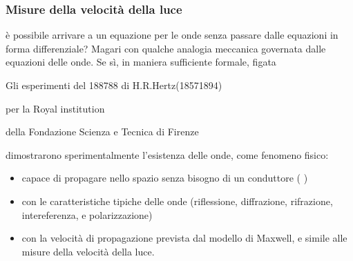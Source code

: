 \documentclass[letterpaper,10pt,italian]{jupyterBook}
\begin{document}
\subsubsection*{Misure della velocità della luce}

\sphinxAtStartPar
{}

\sphinxAtStartPar
{} è possibile arrivare a un equazione per le onde senza passare dalle equazioni in forma differenziale? Magari con qualche analogia meccanica governata dalle equazioni delle onde. Se sì, in maniera sufficiente formale, figata

\sphinxAtStartPar
{} Gli esperimenti del 1887\sphinxhyphen{}88 di H.R.Hertz(1857\sphinxhyphen{}1894)%
\begin{footnote}[1]\sphinxAtStartFootnote
{} per la Royal institution
%
\end{footnote}%
\begin{footnote}[2]\sphinxAtStartFootnote
{} della Fondazione Scienza e Tecnica di Firenze
%
\end{footnote} dimostrarono sperimentalmente l’esistenza delle onde, come fenomeno fisico:
\begin{itemize}
\item {} 
\sphinxAtStartPar
capace di propagare nello spazio senza bisogno di un conduttore ( )

\item {} 
\sphinxAtStartPar
con le caratteristiche tipiche delle onde (riflessione, diffrazione, rifrazione, intereferenza, e polarizzazione)

\item {} 
\sphinxAtStartPar
con la velocità di propagazione prevista dal modello di Maxwell, e simile alle misure della velocità della luce.

\end{itemize}

\sphinxAtStartPar
{}  
\end{document}
